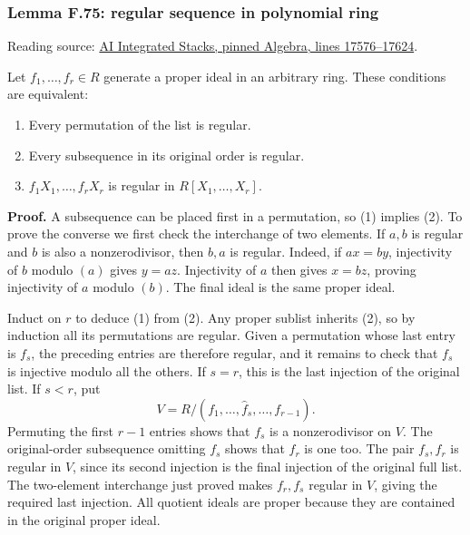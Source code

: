 \documentclass[11pt,a4paper,openany]{report}
\providecommand{\tightlist}{\setlength{\itemsep}{0pt}\setlength{\parskip}{0pt}}
\begin{document}
\subsubsection{Lemma F.75: regular sequence in polynomial ring}\label{AG-RG-S05-lemma-f.75-regular-sequence-in-polynomial-ring}

Reading source: \href{https://github.com/KokunoYumeto/unofficial-stacks-project-ai-drafts/blob/565b10e987aba5969b21145a0833f42d69f96790/algebra.tex\#L17576-L17624}{AI Integrated Stacks, pinned Algebra, lines 17576--17624}.

Let \(f_1,\ldots,f_r\in R\) generate a proper ideal in an arbitrary ring. These conditions are equivalent:

\begin{enumerate}
\def\labelenumi{\arabic{enumi}.}
\tightlist
\item
  Every permutation of the list is regular.
\item
  Every subsequence in its original order is regular.
\item
  \(f_1X_1,\ldots,f_rX_r\) is regular in \(R[X_1,\ldots,X_r]\).
\end{enumerate}

\textbf{Proof.} A subsequence can be placed first in a permutation, so (1) implies (2). To prove the converse we first check the interchange of two elements. If \(a,b\) is regular and \(b\) is also a nonzerodivisor, then \(b,a\) is regular. Indeed, if \(ax=by\), injectivity of \(b\) modulo \((a)\) gives \(y=az\). Injectivity of \(a\) then gives \(x=bz\), proving injectivity of \(a\) modulo \((b)\). The final ideal is the same proper ideal.

Induct on \(r\) to deduce (1) from (2). Any proper sublist inherits (2), so by induction all its permutations are regular. Given a permutation whose last entry is \(f_s\), the preceding entries are therefore regular, and it remains to check that \(f_s\) is injective modulo all the others. If \(s=r\), this is the last injection of the original list. If \(s<r\), put \[V=R/(f_1,\ldots,\widehat f_s,\ldots,f_{r-1}).\] Permuting the first \(r-1\) entries shows that \(f_s\) is a nonzerodivisor on \(V\). The original-order subsequence omitting \(f_s\) shows that \(f_r\) is one too. The pair \(f_s,f_r\) is regular in \(V\), since its second injection is the final injection of the original full list. The two-element interchange just proved makes \(f_r,f_s\) regular in \(V\), giving the required last injection. All quotient ideals are proper because they are contained in the original proper ideal.
\end{document}
